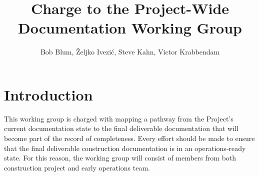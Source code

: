 \documentclass[SE,authoryear,toc]{lsstdoc}
\title[Documentation Working Group Charge]{Charge to the Project-Wide Documentation Working Group}
\author{%
Bob Blum, \v{Z}eljko Ivezi\'c, Steve Kahn, Victor Krabbendam
}
\date{\vcsDate}
\begin{document}
\maketitle

\section{Introduction} 

This working group is charged with mapping a pathway from the Project's current documentation state to the final deliverable documentation that will become part of the record of completeness. Every effort should be made to ensure that the final deliverable construction documentation is in an operations-ready state. For this reason, the working group will consist of members from both construction project and early operations team.
\end{document}
